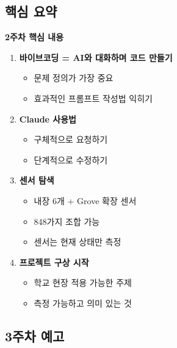 \documentclass[11pt, a4paper]{article}
\begin{document}
\subsection{핵심 요약}

\begin{keypoint}
\textbf{2주차 핵심 내용}

\begin{enumerate}
  \item \textbf{바이브코딩 = AI와 대화하며 코드 만들기}
  \begin{itemize}
    \item 문제 정의가 가장 중요
    \item 효과적인 프롬프트 작성법 익히기
  \end{itemize}
  
  \item \textbf{Claude 사용법}
  \begin{itemize}
    \item 구체적으로 요청하기
    \item 단계적으로 수정하기
  \end{itemize}
  
  \item \textbf{센서 탐색}
  \begin{itemize}
    \item 내장 6개 + Grove 확장 센서
    \item 848가지 조합 가능
    \item 센서는 현재 상태만 측정
  \end{itemize}
  
  \item \textbf{프로젝트 구상 시작}
  \begin{itemize}
    \item 학교 현장 적용 가능한 주제
    \item 측정 가능하고 의미 있는 것
  \end{itemize}
\end{enumerate}
\end{keypoint}

\subsection{3주차 예고}
\end{document}
